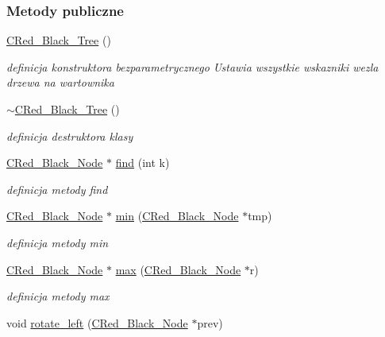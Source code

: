 \subsubsection*{Metody publiczne}
\begin{DoxyCompactItemize}
\item 
\hyperlink{class_c_red___black___tree_a03a4710e80b0315403d8fcd447328152}{C\+Red\+\_\+\+Black\+\_\+\+Tree} ()
\begin{DoxyCompactList}\small\item\em definicja konstruktora bezparametrycznego Ustawia wszystkie wskazniki wezla drzewa na wartownika \end{DoxyCompactList}\item 
\hyperlink{class_c_red___black___tree_a90887157e491b6dd7dab8d94c2bfaa41}{$\sim$\+C\+Red\+\_\+\+Black\+\_\+\+Tree} ()
\begin{DoxyCompactList}\small\item\em definicja destruktora klasy \end{DoxyCompactList}\item 
\hyperlink{class_c_red___black___node}{C\+Red\+\_\+\+Black\+\_\+\+Node} $\ast$ \hyperlink{class_c_red___black___tree_a232c5b21a10f5556275eb0c056777994}{find} (int k)
\begin{DoxyCompactList}\small\item\em definicja metody find \end{DoxyCompactList}\item 
\hyperlink{class_c_red___black___node}{C\+Red\+\_\+\+Black\+\_\+\+Node} $\ast$ \hyperlink{class_c_red___black___tree_a304a7059598bc5cdcf7d46cf195444e0}{min} (\hyperlink{class_c_red___black___node}{C\+Red\+\_\+\+Black\+\_\+\+Node} $\ast$tmp)
\begin{DoxyCompactList}\small\item\em definicja metody min \end{DoxyCompactList}\item 
\hyperlink{class_c_red___black___node}{C\+Red\+\_\+\+Black\+\_\+\+Node} $\ast$ \hyperlink{class_c_red___black___tree_abe318b1c3d322bc8fe63c5137f7d099b}{max} (\hyperlink{class_c_red___black___node}{C\+Red\+\_\+\+Black\+\_\+\+Node} $\ast$r)
\begin{DoxyCompactList}\small\item\em definicja metody max \end{DoxyCompactList}\item 
void \hyperlink{class_c_red___black___tree_a02d506e4bb92993d2c4fc180c90ff4e5}{rotate\+\_\+left} (\hyperlink{class_c_red___black___node}{C\+Red\+\_\+\+Black\+\_\+\+Node} $\ast$prev)

\end{DoxyCompactItemize}
